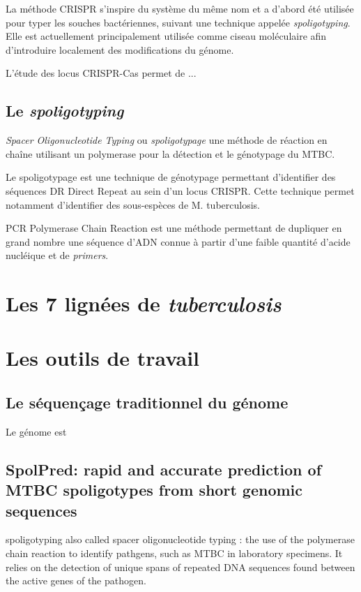 \documentclass[twoside,a4paper,12pt,frenchb,openany]{report}
\begin{document}
La méthode CRISPR s'inspire du système du même nom et a d'abord été utilisée pour typer les souches bactériennes, suivant une technique appelée \textit{spoligotyping}. Elle est actuellement principalement utilisée comme ciseau moléculaire afin d'introduire localement des modifications du génome.

L'étude des locus CRISPR-Cas permet de ...

\subsection{Le \textit{spoligotyping}}

\textit{Spacer Oligonucleotide Typing} ou \textit{spoligotypage} une méthode de réaction en chaîne utilisant un polymerase pour la détection et le génotypage du MTBC.

Le spoligotypage est une technique de génotypage permettant d'identifier des séquences DR Direct Repeat au sein d'un locus CRISPR. Cette technique permet notamment d'identifier des sous-espèces de M. tuberculosis.

PCR Polymerase Chain Reaction est une méthode permettant de dupliquer en grand nombre une séquence d'ADN connue à partir d'une faible quantité d'acide nucléique et de \textit{primers}. 

\section{Les 7 lignées de \textit{tuberculosis}}


\section{Les outils de travail}

\subsection{Le séquençage traditionnel du génome}

Le génome est 

\subsection{SpolPred: rapid and accurate prediction of MTBC spoligotypes from short genomic sequences}

spoligotyping also called spacer oligonucleotide typing : the use of the polymerase chain reaction to identify pathgens, such as MTBC in laboratory specimens. It relies on the detection of unique spans of repeated DNA sequences found between the active genes of the pathogen.
\end{document}
